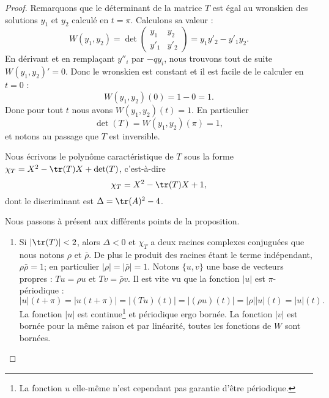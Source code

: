 \begin{proof}
	Remarquons que le déterminant de la matrice \( T\) est égal au wronskien des solutions \( y_1\) et \( y_2\) calculé en \( t=\pi\). Calculons sa valeur :
	\begin{equation}
		W(y_1,y_2)=\det\begin{pmatrix}
			y_1  & y_2  \\
			y'_1 & y'_2
		\end{pmatrix}=y_1y'_2-y'_1y_2.
	\end{equation}
	En dérivant et en remplaçant \( y''_i\) par \( -qy_i\), nous trouvons tout de suite \( W(y_1,y_2)'=0\). Donc le wronskien est constant et il est facile de le calculer en \( t=0\) :
	\begin{equation}
		W(y_1,y_2)(0)=1-0=1.
	\end{equation}
	Donc pour tout \( t\) nous avons \( W(y_1,y_2)(t)=1\). En particulier
	\begin{equation}
		\det(T)=W(y_1,y_2)(\pi)=1,
	\end{equation}
	et notons au passage que \( T\) est inversible.

	Nous écrivons le polynôme caractéristique de \( T\) sous la forme \( \chi_T=X^2-\tr(T)X+\det(T)\), c'est-à-dire
	\begin{equation}
		\chi_T=X^2-\tr(T)X+1,
	\end{equation}
	dont le discriminant est \( \Delta=\tr(A)^2-4\).

	Nous passons à présent aux différents points de la proposition.
	\begin{enumerate}
		\item
		      Si \( | \tr(T) |<2\), alors \( \Delta<0\) et \( \chi_T\) a deux racines complexes conjuguées que nous notons \( \rho\) et \( \bar\rho\). De plus le produit des racines étant le terme indépendant, \( \rho\bar\rho=1\); en particulier \( | \rho |=| \bar \rho |=1\). Notons \( \{ u,v \}\) une base de vecteurs propres : \( Tu=\rho u\) et \( Tv=\bar \rho v\). Il est vite vu que la fonction \( | u |\) est \( \pi\)-périodique :
		      \begin{equation}
			      | u |(t+\pi)=| u(t+\pi) |=| (Tu)(t) |=| (\rho u)(t) |=| \rho | | u |(t)=| u |(t).
		      \end{equation}
		      La fonction \( | u |\) est continue\footnote{La fonction \( u\) elle-même n'est cependant pas garantie d'être périodique.} et périodique ergo bornée. La fonction \( | v |\) est bornée pour la même raison et par linéarité, toutes les fonctions de \( W\) sont bornées.


\end{enumerate}
\end{proof}
